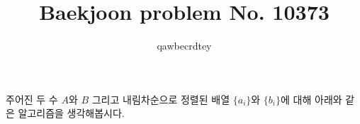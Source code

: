 \documentclass{article}
\title{Baekjoon problem No. 10373}
\author{qawbecrdtey}
\theoremstyle{definition}
\theoremstyle{remark}
\begin{document}
\maketitle

주어진 두 수 $A$와 $B$ 그리고 내림차순으로 정렬된 배열 $\{a_i\}$와 $\{b_i\}$에 대해 아래와 같은 알고리즘을 생각해봅시다.
\end{document}
